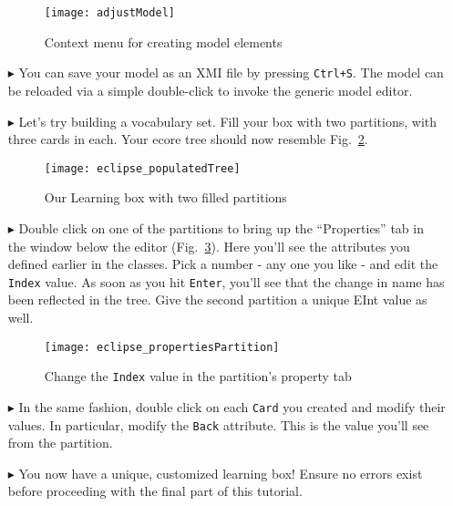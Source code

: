 \begin{itemize}
\begin{figure}[htbp]
	\centering
  \texttt{[image: adjustModel]}
	\caption{Context menu for creating model elements}
	\label{fig:create_instance}
\end{figure}

\item[$\blacktriangleright$] You can save your model as an XMI file by pressing \texttt{Ctrl+S}. The model can be reloaded via a simple double-click to invoke
the generic model editor.

\item[$\blacktriangleright$] Let's try building a vocabulary set. Fill your box with two partitions, with three cards in each. Your ecore tree should now
resemble Fig.~\ref{fig:eclipse_populatedTree}.

\begin{figure}[htbp]
	\centering
  \texttt{[image: eclipse\_populatedTree]}
	\caption{Our Learning box with two filled partitions}
	\label{fig:eclipse_populatedTree}
\end{figure}

\vfill
\pagebreak

\item[$\blacktriangleright$] Double click on one of the partitions to bring up the ``Properties'' tab in the window below the editor
(Fig.~\ref{fig:properties_partition}). Here you'll see the attributes you defined earlier in the classes. Pick a number - any one you like - and edit the
\texttt{Index} value. As soon as you hit \texttt{Enter}, you'll see that the change in name has been reflected in the tree. Give the second partition a unique
EInt value as well.

\begin{figure}[htbp]
	\centering
  \texttt{[image: eclipse\_propertiesPartition]}
	\caption{Change the \texttt{Index} value in the partition's property tab}
	\label{fig:properties_partition}
\end{figure}

\item[$\blacktriangleright$] In the same fashion, double click on each \texttt{Card} you created and modify their values. In particular, modify the
\texttt{Back} attribute. This is the value you'll see from the partition.

\item[$\blacktriangleright$] You now have a unique, customized learning box! Ensure no errors exist before proceeding with the final part of this tutorial.

\end{itemize}

